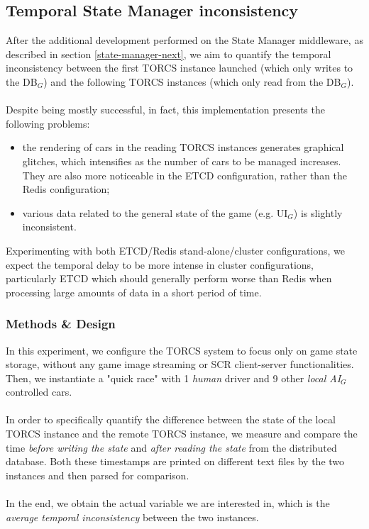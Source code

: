\subsection{Temporal State Manager inconsistency}\label{ex:temp-state-inconsistency}
After the additional development performed on the State Manager middleware, as described in section \ref{state-manager-next}, we aim to quantify the temporal inconsistency between the first TORCS instance launched (which only writes to the DB$_G$) and the following TORCS instances (which only read from the DB$_G$). \\ \\
Despite being mostly successful, in fact, this implementation presents the following problems:
\begin{itemize}
	\item the rendering of cars in the reading TORCS instances generates graphical glitches, which intensifies as the number of cars to be managed increases. They are also more noticeable in the ETCD configuration, rather than the Redis configuration;
	\item various data related to the general state of the game (e.g. UI$_G$) is slightly inconsistent.
\end{itemize}
Experimenting with both ETCD/Redis stand-alone/cluster configurations, we expect the temporal delay to be more intense in cluster configurations, particularly ETCD which should generally perform worse than Redis when processing large amounts of data in a short period of time.
\subsubsection{Methods \& Design}
In this experiment, we configure the TORCS system to focus only on game state storage, without any game image streaming or SCR client-server functionalities. Then, we instantiate a "quick race" with 1 \textit{human} driver and 9 other \textit{local AI$_G$} controlled cars. \\ \\
In order to specifically quantify the difference between the state of the local TORCS instance and the remote TORCS instance, we measure and compare the time \textit{before writing the state} and \textit{after reading the state} from the distributed database. Both these timestamps are printed on different text files by the two instances and then parsed for comparison. \\ \\
In the end, we obtain the actual variable we are interested in, which is the \textit{average temporal inconsistency} between the two instances.


